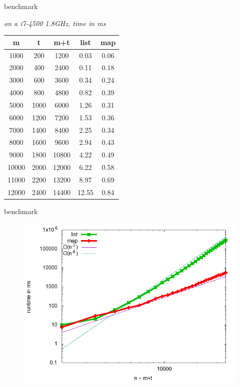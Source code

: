\begin{frame}{benchmark}

  {\em on a i7-4500 1.8GHz, time in ms}
  \vspace{10pt}

\hspace{100pt}\begin{tabular}{|c|c|c|c|c|}
\hline
       m & t & m+t & list & map\\
\hline
      1000&       200&      1200&      0.03&      0.06\\
      2000&       400&      2400&      0.11&      0.18\\
      3000&       600&      3600&      0.34&      0.24\\
      4000&       800&      4800&      0.82&      0.39\\
      5000&      1000&      6000&      1.26&      0.31\\
      6000&      1200&      7200&      1.53&      0.36\\
      7000&      1400&      8400&      2.25&      0.34\\
      8000&      1600&      9600&      2.94&      0.43\\
      9000&      1800&     10800&      4.22&      0.49\\
     10000&      2000&     12000&      6.22&      0.58\\
     11000&      2200&     13200&      8.97&      0.69\\
     12000&      2400&     14400&     12.55&      0.84\\
\hline
\end{tabular}


\end{frame}

\begin{frame}{benchmark}

\begin{figure}
 \includegraphics[scale=0.5]{map.png}
\end{figure}

\end{frame}

